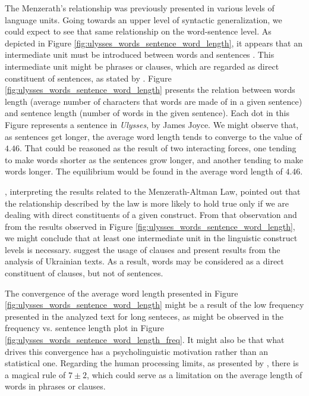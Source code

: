

The Menzerath's relationship was previously presented in various levels of language units.
Going towards an upper level of syntactic generalization, we could expect to see that same relationship
on the word-sentence level. As depicted in Figure \ref{fig:ulysses_words_sentence_word_length},
it appears that an intermediate unit must be introduced between words and sentences \citep{kohler2005}.
This intermediate unit might be phrases or clauses, which are regarded as direct constituent of
sentences, as stated by \cite{grzybek2006}. Figure \ref{fig:ulysses_words_sentence_word_length} presents the
relation between words length (average number of characters that words are made of in a given sentence)
and sentence length (number of words in the given sentence). Each dot in this Figure represents 
a sentence in \textit{Ulysses}, by James Joyce. We might observe that, as sentences get longer,
the average word length tends to converge to the value of $4.46$. That could be reasoned as 
the result of two interacting forces, one tending to make words shorter as the sentences grow
longer, and another tending to make words longer. The equilibrium would be found in the
average word length of $4.46$. 

\cite{altmann1983}, interpreting the results related to the Menzerath-Altman Law, pointed out that
the relationship described by the law is more likely to hold true only if we are dealing with
direct constituents of a given construct.
From that observation and from the results observed in Figure \ref{fig:ulysses_words_sentence_word_length}, 
we might conclude that at least one intermediate
unit in the linguistic construct levels is necessary. \cite{buk2007} suggest the usage of clauses
and present results from the analysis of Ukrainian texts.
As a result, words may be considered as a direct constituent of clauses, but not of sentences.

The convergence of the average word length presented in Figure \ref{fig:ulysses_words_sentence_word_length}
might be a result of the low frequency presented in the analyzed text for long senteces,
as might be observed in the frequency vs. sentence length plot in Figure \ref{fig:ulysses_words_sentence_word_length_freq}.
It might also be that what drives this convergence has a psycholinguistic motivation rather than an statistical one.
Regarding the human processing limits, as presented by \cite{miller1956}, there is a magical rule of
$7 \pm 2$, which could serve as a limitation on the average length of words in phrases or clauses.
 

